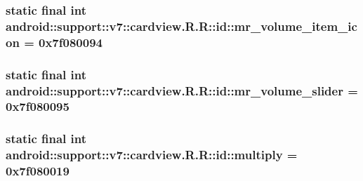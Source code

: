 \hypertarget{classandroid_1_1support_1_1v7_1_1cardview_1_1_r_1_1id_a5e173d8644f19c7e14c28b10b67378a}{
\subsubsection[{mr\_\-volume\_\-item\_\-icon}]{\setlength{\rightskip}{0pt plus 5cm}static final int android::support::v7::cardview.R.R::id::mr\_\-volume\_\-item\_\-icon = 0x7f080094}}
\label{classandroid_1_1support_1_1v7_1_1cardview_1_1_r_1_1id_a5e173d8644f19c7e14c28b10b67378a}


\hypertarget{classandroid_1_1support_1_1v7_1_1cardview_1_1_r_1_1id_9760a85f1a254dfd2e7da5c99539bc76}{
\subsubsection[{mr\_\-volume\_\-slider}]{\setlength{\rightskip}{0pt plus 5cm}static final int android::support::v7::cardview.R.R::id::mr\_\-volume\_\-slider = 0x7f080095}}
\label{classandroid_1_1support_1_1v7_1_1cardview_1_1_r_1_1id_9760a85f1a254dfd2e7da5c99539bc76}


\hypertarget{classandroid_1_1support_1_1v7_1_1cardview_1_1_r_1_1id_cd25e439fa266c3b09d8f35688ad5177}{
\subsubsection[{multiply}]{\setlength{\rightskip}{0pt plus 5cm}static final int android::support::v7::cardview.R.R::id::multiply = 0x7f080019}}
\label{classandroid_1_1support_1_1v7_1_1cardview_1_1_r_1_1id_cd25e439fa266c3b09d8f35688ad5177}


